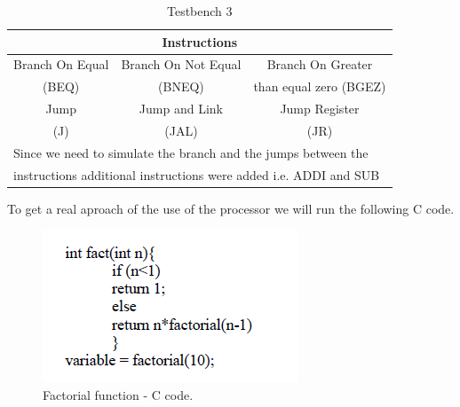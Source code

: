 \documentclass[conference]{IEEEtran}
\begin{document}
\begin{table}[htbp]
\caption{Testbench 3} %
\begin{center}
\begin{tabular}{|c|c|c|}
\hline
\multicolumn{3}{|c|}{\textbf{Instructions}} \\
\hline
Branch On Equal&Branch On Not Equal&Branch On Greater \\
(BEQ)&(BNEQ)&than equal zero (BGEZ)  \\
\hline
Jump&Jump and Link&Jump Register\\
(J)&(JAL)&(JR) \\
\hline
\multicolumn{3}{l}{Since we need to simulate the branch and the jumps between the} \\
\multicolumn{3}{l}{instructions additional instructions were added i.e. ADDI and  SUB}\\
\end{tabular}
\label{tab_test3}
\end{center}
\end{table}

To get a real aproach of the use of the processor we will run the following C code.
\begin{figure}[h]
\begin{center}
\includegraphics[scale=0.8]{factorial_c.png}
\caption{Factorial function - C code.}
\label{fact_c}
\end{center}
\end{figure}
\end{document}
